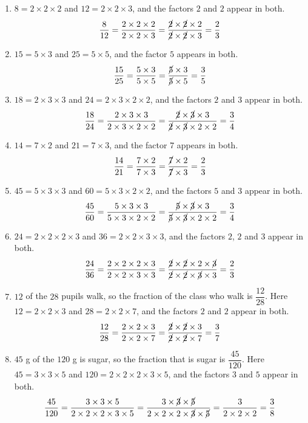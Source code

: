 \documentclass[12pt,a4paper]{article}
\begin{document}
\begin{enumerate}
\item $8=2\times2\times2$ and $12=2\times2\times3$, and the factors $2$ and $2$
appear in both.
\[\frac{8}{12}=\frac{2\times2\times2}{2\times2\times3}
  =\frac{\cancel{2}\times\cancel{2}\times2}{\cancel{2}\times\cancel{2}\times3}
  =\frac{2}{3}\]

\item $15=5\times3$ and $25=5\times5$, and the factor $5$ appears in both.
\[\frac{15}{25}=\frac{5\times3}{5\times5}
  =\frac{\cancel{5}\times3}{\cancel{5}\times5}=\frac{3}{5}\]

\item $18=2\times3\times3$ and $24=2\times3\times2\times2$, and the factors $2$
and $3$ appear in both.
\[\frac{18}{24}=\frac{2\times3\times3}{2\times3\times2\times2}
  =\frac{\cancel{2}\times\cancel{3}\times3}
   {\cancel{2}\times\cancel{3}\times2\times2}=\frac{3}{4}\]

\item $14=7\times2$ and $21=7\times3$, and the factor $7$ appears in both.
\[\frac{14}{21}=\frac{7\times2}{7\times3}
  =\frac{\cancel{7}\times2}{\cancel{7}\times3}=\frac{2}{3}\]

\item $45=5\times3\times3$ and $60=5\times3\times2\times2$, and the factors $5$
and $3$ appear in both.
\[\frac{45}{60}=\frac{5\times3\times3}{5\times3\times2\times2}
  =\frac{\cancel{5}\times\cancel{3}\times3}
   {\cancel{5}\times\cancel{3}\times2\times2}=\frac{3}{4}\]

\item $24=2\times2\times2\times3$ and $36=2\times2\times3\times3$, and the
factors $2$, $2$ and $3$ appear in both.
\[\frac{24}{36}=\frac{2\times2\times2\times3}{2\times2\times3\times3}
  =\frac{\cancel{2}\times\cancel{2}\times2\times\cancel{3}}
   {\cancel{2}\times\cancel{2}\times\cancel{3}\times3}=\frac{2}{3}\]

\item $12$ of the $28$ pupils walk, so the fraction of the class who walk is
$\dfrac{12}{28}$. Here $12=2\times2\times3$ and $28=2\times2\times7$, and the
factors $2$ and $2$ appear in both.
\[\frac{12}{28}=\frac{2\times2\times3}{2\times2\times7}
  =\frac{\cancel{2}\times\cancel{2}\times3}{\cancel{2}\times\cancel{2}\times7}
  =\frac{3}{7}\]

\item $45$ g of the $120$ g is sugar, so the fraction that is sugar is
$\dfrac{45}{120}$. Here $45=3\times3\times5$ and $120=2\times2\times2\times3\times5$,
and the factors $3$ and $5$ appear in both.
\[\frac{45}{120}=\frac{3\times3\times5}{2\times2\times2\times3\times5}
  =\frac{3\times\cancel{3}\times\cancel{5}}
   {2\times2\times2\times\cancel{3}\times\cancel{5}}
  =\frac{3}{2\times2\times2}=\frac{3}{8}\]
\end{enumerate}
\end{document}
